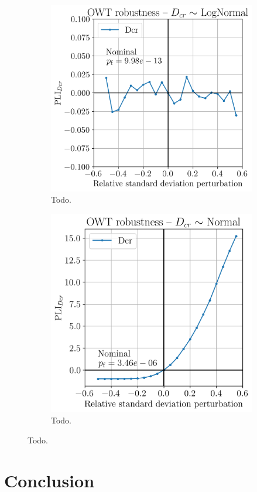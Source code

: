 \begin{figure}
    \centering
    \begin{subfigure}[t]{0.48\linewidth}
        \includegraphics[width=\linewidth]{./part3/figures/OWT/PLI_Dcr_Hyp_LogNormal.png}
        \caption{Todo.}
    \end{subfigure}
    \begin{subfigure}[t]{0.45\linewidth}
        \includegraphics[width=\linewidth]{./part3/figures/OWT/PLI_Dcr_Hyp_Normal.png}
        \caption{Todo.}
    \end{subfigure}
    \label{fig:pli_resistance}
    \caption{Todo.}
\end{figure}

\section{Conclusion}




